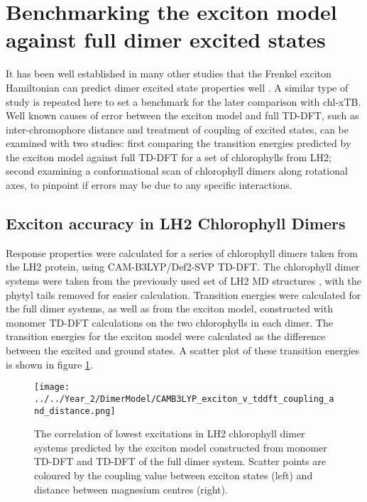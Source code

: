 \section{Benchmarking the exciton model against full dimer excited states}
\label{sec:exction_v_full_dimer}

It has been well established in many other studies that the Frenkel exciton Hamiltonian
can predict dimer excited state properties well \cite{Kenny2016, Sisto2014a}. A 
similar type of study is repeated here to set a benchmark for the later comparison
with chl-xTB. Well known causes of error between the exciton model and full TD-DFT,
such as inter-chromophore distance and treatment of coupling of excited states, 
can be examined with two studies: first comparing the transition energies predicted
by the exciton model against full TD-DFT for a set of chlorophylls from LH2; second 
examining a conformational scan of chlorophyll dimers along rotational axes, to 
pinpoint if errors may be due to any specific interactions.

\subsection{Exciton accuracy in LH2 Chlorophyll Dimers}
\label{subsec:LH2_exciton_camb3lyp}

Response properties were calculated for a series of chlorophyll dimers taken from
the LH2 protein, using CAM-B3LYP/Def2-SVP TD-DFT. The chlorophyll dimer systems
were taken from the previously used set of LH2 MD structures \cite{Stross2016},
with the phytyl tails removed for easier calculation. Transition energies were
calculated for the full dimer systems, as well as from the exciton model, constructed 
with monomer TD-DFT calculations on the two chlorophylls in each dimer. The transition
energies for the exciton model were calculated as the difference between the excited and ground states. 
A scatter plot of these transition energies is shown in figure \ref{fig:camb3lyp_excitons}. 

\begin{figure}
    \centering
    \texttt{[image: ../../Year\_2/DimerModel/CAMB3LYP\_exciton\_v\_tddft\_coupling\_and\_distance.png]}
    \caption{The correlation of lowest excitations in LH2 chlorophyll dimer systems
    predicted by the exciton model constructed from monomer TD-DFT and TD-DFT of
    the full dimer system. Scatter points are coloured by the coupling value between
    exciton states (left) and distance between magnesium centres (right).}
    \label{fig:camb3lyp_excitons}
\end{figure}


